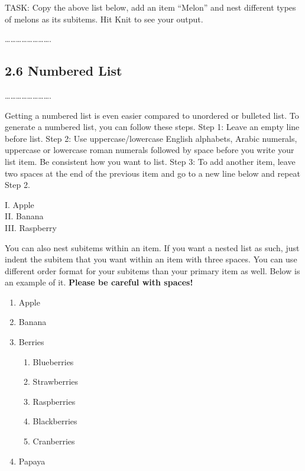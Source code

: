 \documentclass[
]{article}
\providecommand{\tightlist}{%
  \setlength{\itemsep}{0pt}\setlength{\parskip}{0pt}}
\begin{document}
\hfill\break

TASK: Copy the above list below, add an item ``Melon'' and nest
different types of melons as its subitems. Hit Knit to see your output.

\ldots\ldots\ldots\ldots\ldots\ldots\ldots\ldots.

\subsection{2.6 Numbered List}\label{numbered-list}

\ldots\ldots\ldots\ldots\ldots\ldots\ldots\ldots.

Getting a numbered list is even easier compared to unordered or bulleted
list. To generate a numbered list, you can follow these steps. Step 1:
Leave an empty line before list. Step 2: Use uppercase/lowercase English
alphabets, Arabic numerals, uppercase or lowercase roman numerals
followed by space before you write your list item. Be consistent how you
want to list. Step 3: To add another item, leave two spaces at the end
of the previous item and go to a new line below and repeat Step 2.

I. Apple\\
II. Banana\\
III. Raspberry

\hfill\break

You can also nest subitems within an item. If you want a nested list as
such, just indent the subitem that you want within an item with three
spaces. You can use different order format for your subitems than your
primary item as well. Below is an example of it. \textbf{Please be
careful with spaces!}

\begin{enumerate}
\def\labelenumi{\arabic{enumi}.}
\tightlist
\item
  Apple
\item
  Banana
\item
  Berries

  \begin{enumerate}
  \def\labelenumii{\arabic{enumii}.}
  \tightlist
  \item
    Blueberries
  \item
    Strawberries
  \item
    Raspberries
  \item
    Blackberries
  \item
    Cranberries
  \end{enumerate}
\item
  Papaya
\end{enumerate}
\end{document}
